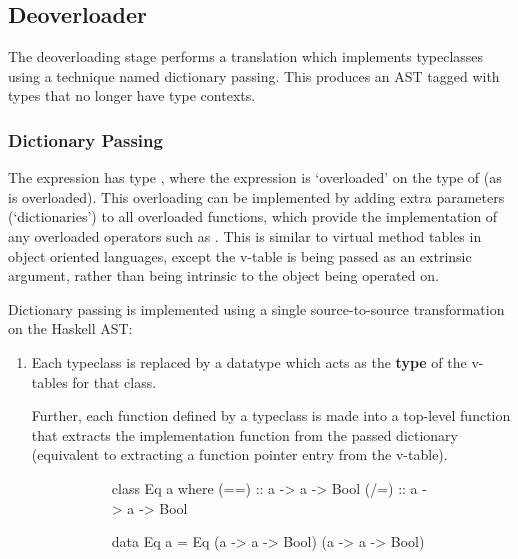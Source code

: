 \documentclass[dissertation.tex]{subfiles}
\begin{document}
{    \subsection{Deoverloader}\label{sec:deoverloading}
    {
        The deoverloading stage performs a translation which implements typeclasses using a technique named dictionary passing. This produces an AST tagged with types that no longer have type contexts.

        \subsubsection{Dictionary Passing}
        {
            The expression  has type , where the expression is `overloaded' on the type of  (as \haskell{(+)} is overloaded). This overloading can be implemented by adding extra parameters (`dictionaries') to all overloaded functions, which provide the implementation of any overloaded operators such as \haskell{(+)}. This is similar to virtual method tables in object oriented languages, except the v-table is being passed as an extrinsic argument, rather than being intrinsic to the object being operated on.

            Dictionary passing is implemented using a single source-to-source transformation on the Haskell AST:
            
            \begin{enumerate}
            \item
            {
                Each typeclass is replaced by a datatype which acts as the \textbf{type} of the v-tables for that class.

                Further, each function defined by a typeclass is made into a top-level function that extracts the implementation function from the passed dictionary (equivalent to extracting a function
                pointer entry from the v-table).

                \begin{figure}[H]
                \centering
                \begin{subfigure}[t]{0.35\textwidth}
                \begin{haskellfigure}
                class Eq a where
                    (==) :: a -> a -> Bool
                    (/=) :: a -> a -> Bool
                \end{haskellfigure}
                \end{subfigure}
                \hspace{5mm}
                \begin{subfigure}[t]{0.55\textwidth}
                \begin{haskellfigure}
                data Eq a = Eq (a -> a -> Bool) (a -> a -> Bool)


\end{haskellfigure}
\end{subfigure}
\end{figure}}
\end{enumerate}}}}
\end{document}
